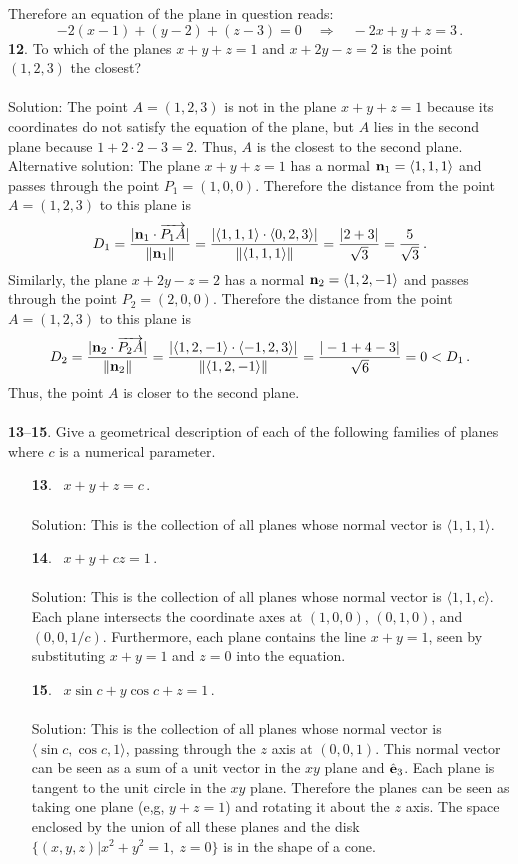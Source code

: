 \documentclass[12pt]{amsbook}
\newcommand{\la}{\langle}
\newcommand{\ra}{\rangle}
\begin{document}
Therefore an equation of the plane in question reads:
$$
-2(x-1)+(y-2)+(z-3)=0\quad\Rightarrow\quad -2x+y+z=3\,.
$$
{\small\bf 12}. To which of the planes $x+y+z=1$ and $x+2y-z=2$ is the
point $(1,2,3)$ the closest?\\
\\
{\sc Solution}: The point $A=(1,2,3)$ is not in the plane $x+y+z=1$ because
its coordinates do not satisfy the equation of the plane, but 
$A$ lies in the second plane because $1+2\cdot 2 -3=2$. Thus, 
$A$ is the closest to the second plane.\\
{\sc Alternative solution}:   
The plane $x+y+z=1$ has a normal ${\bf n}_1=\la 1,1,1\ra$
and passes through the point $P_1=(1,0,0)$. Therefore the distance 
from the point $A=(1,2,3)$ to this plane is 
$$
D_1 = \frac{|{\bf n}_1\cdot\overrightarrow{P_1A}|}{\|{\bf n}_1\|}=
\frac{|\la 1,1,1\ra\cdot\la 0,2,3\ra|}{\|\la 1,1,1\ra\|}=
\frac{|2+3|}{\sqrt{3}}=\frac{5}{\sqrt{3}}\,.
$$
Similarly, the plane $x + 2y - z = 2$ has a normal ${\bf n}_2=
\la 1,2,-1\ra$ and passes through the point $P_2=(2,0,0)$. 
Therefore the distance 
from the point $A=(1,2,3)$ to this plane is 
$$
D_2 = \frac{|{\bf n}_2\cdot\overrightarrow{P_2A}|}{\|{\bf n}_2\|}=
\frac{|\la 1,2,-1\ra\cdot\la -1,2,3\ra|}{\|\la 1,2,-1\ra\|}
=\frac{|-1+4-3|}{\sqrt{6}}=0<D_1\,.
$$
Thus, the point $A$ is closer to the second plane.\\
\\
{\small\bf 13}--{\small\bf 15}. 
Give a geometrical description of each of the following families
of planes where $c$ is a numerical parameter.
\begin{enumerate} \item[{\small\bf 13}.]\ $x+y+z=c$\,. \\
\\
{\sc Solution}: This is the collection of all planes whose normal vector is $\la 1,1,1 \ra$. 
\\
 \item[{\small\bf 14}.]\ $x+y+cz=1$\,.\\
\\
{\sc Solution}: This is the collection of all planes whose normal vector is $\la 1,1,c \ra$. Each plane intersects the coordinate axes at $(1,0,0)$, $(0,1,0)$, and $(0,0,1/c)$. Furthermore, each plane contains the line $x+y=1$, seen by substituting $x+y=1$ and $z=0$ into the equation.
\\
 \item[{\small\bf 15}.] \ $x\sin
c+y\cos c+z=1$\,.\\
\\
{\sc Solution}: This is the collection of all planes whose normal vector is $\la \sin c,\cos c,1 \ra$, passing through the $z$ axis at $(0,0,1)$. This normal vector can be seen as a sum of a unit vector in the $xy$ plane and $\hat{\bf e}_3$. Each plane is tangent to the unit circle in the $xy$ plane. Therefore the planes can be seen as taking one plane (e,g, $y+z=1$) and rotating it about the $z$ axis. The space enclosed by the union of all these planes and the disk $\{(x,y,z)|x^2+y^2=1, \ z=0\}$ is in the shape of a cone. 
\\
\end{enumerate}  
\end{document}
